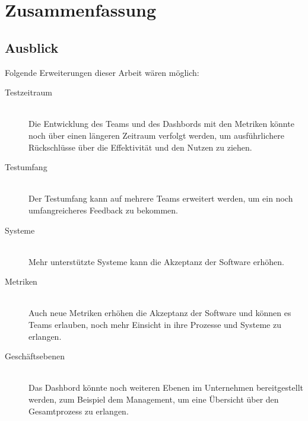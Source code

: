 \chapter{Zusammenfassung}



\section{Ausblick}

Folgende Erweiterungen dieser Arbeit wären möglich:

\begin{description}
    \item[Testzeitraum] \hfill \\ Die Entwicklung des Teams und des Dashbords mit den Metriken könnte noch über einen längeren Zeitraum verfolgt werden, um ausführlichere Rückschlüsse über die Effektivität und den Nutzen zu ziehen.
    \item[Testumfang] \hfill \\ Der Testumfang kann auf mehrere Teams erweitert werden, um ein noch umfangreicheres Feedback zu bekommen.
    \item[Systeme] \hfill \\ Mehr unterstützte Systeme kann die Akzeptanz der Software erhöhen.
    \item[Metriken] \hfill \\ Auch neue Metriken erhöhen die Akzeptanz der Software und können es Teams erlauben, noch mehr Einsicht in ihre Prozesse und Systeme zu erlangen.
    \item[Geschäftsebenen] \hfill \\ Das Dashbord könnte noch weiteren Ebenen im Unternehmen bereitgestellt werden, zum Beispiel dem Management, um eine Übersicht über den Gesamtprozess zu erlangen.
\end{description}
